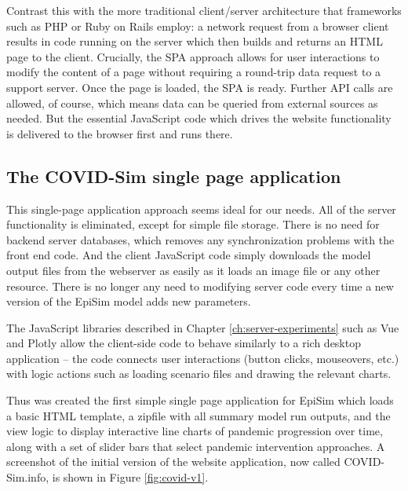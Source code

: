 Contrast this with the more traditional client/server architecture that frameworks such as PHP or Ruby on Rails employ: a network request from a browser client results in code running on the server which then builds and returns an HTML page to the client. Crucially, the SPA approach allows for user interactions to modify the content of a page without requiring a round-trip data request to a support server. Once the page is loaded, the SPA is ready. Further API calls are allowed, of course, which means data can be queried from external sources as needed. But the essential JavaScript code which drives the website functionality is delivered to the browser first and runs there.

\hypertarget{covid-single-page-application}{%
\subsection{The COVID-Sim single page application}\label{covid-single-page-application}}

This single-page application approach seems ideal for our needs. All of the server functionality is eliminated, except for simple file storage. There is no need for backend server databases, which removes any synchronization problems with the front end code. And the client JavaScript code simply downloads the model output files from the webserver as easily as it loads an image file or any other resource. There is no longer any need to modifying server code every time a new version of the EpiSim model adds new parameters.

The JavaScript libraries described in Chapter \ref{ch:server-experiments} such as Vue and Plotly allow the client-side code to behave similarly to a rich desktop application -- the code connects user interactions (button clicks, mouseovers, etc.) with logic actions such as loading scenario files and drawing the relevant charts.

Thus was created the first simple single page application for EpiSim which loads a basic HTML template, a zipfile with all summary model run outputs, and the view logic to display interactive line charts of pandemic progression over time, along with a set of slider bars that select pandemic intervention approaches. A screenshot of the initial version of the website application, now called COVID-Sim.info, is shown in Figure \ref{fig:covid-v1}.

